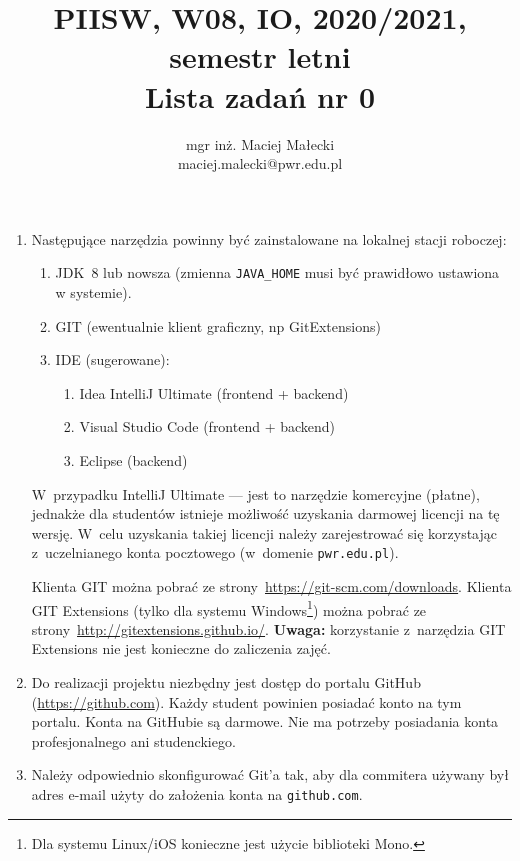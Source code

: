 \documentclass[12pt]{article}
\title{PIISW, W08, IO, 2020/2021, semestr letni\\Lista zadań nr 0}
\author{mgr inż. Maciej Małecki\\\small{maciej.malecki@pwr.edu.pl}}
\begin{document}
    \maketitle

    \begin{enumerate}
        \item Następujące narzędzia powinny być zainstalowane na lokalnej stacji roboczej:
            \begin{enumerate}
                \item JDK~8 lub nowsza (zmienna \texttt{JAVA\_HOME} musi być prawidłowo ustawiona w systemie).
                \item GIT (ewentualnie klient graficzny, np GitExtensions)
                \item IDE (sugerowane):
                    \begin{enumerate}
                        \item Idea IntelliJ Ultimate (frontend + backend)
                        \item Visual Studio Code (frontend + backend)
                        \item Eclipse (backend)
                    \end{enumerate}
            \end{enumerate}
            
            W~przypadku IntelliJ Ultimate — jest to narzędzie komercyjne (płatne), jednakże dla studentów istnieje możliwość uzyskania darmowej licencji na tę wersję. W~celu uzyskania takiej licencji należy zarejestrować się korzystając z~uczelnianego konta pocztowego (w~domenie \texttt{pwr.edu.pl}).

            Klienta GIT można pobrać ze strony~\url{https://git-scm.com/downloads}. Klienta GIT Extensions (tylko dla systemu Windows\footnote{Dla systemu Linux/iOS konieczne jest użycie biblioteki Mono.}) można pobrać ze strony~\url{http://gitextensions.github.io/}. \textbf{Uwaga:} korzystanie z~narzędzia GIT Extensions nie jest konieczne do zaliczenia zajęć.

        \item Do realizacji projektu niezbędny jest dostęp do portalu GitHub (\url{https://github.com}). Każdy student powinien posiadać konto na tym portalu. Konta na GitHubie są darmowe. Nie ma potrzeby posiadania konta profesjonalnego ani studenckiego.

        \item Należy odpowiednio skonfigurować Git’a tak, aby dla commitera używany był adres e-mail użyty do założenia konta na \texttt{github.com}.


\end{enumerate}
\end{document}
